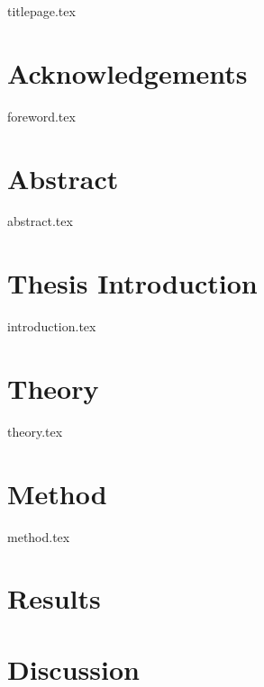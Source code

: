 \documentclass[12pt, a4paper]{report}
\begin{document}
{titlepage.tex}

\chapter*{Acknowledgements}
{foreword.tex}
\afterpage{\blankpage}

\chapter*{Abstract}
{abstract.tex}
\afterpage{\blankpage}

\tableofcontents
\newpage
\afterpage{\blankpage}

\chapter{Thesis Introduction}
{introduction.tex}

\chapter{Theory}
{theory.tex}

\chapter{Method}
{method.tex}

\chapter{Results}

\chapter{Discussion}

\onecolumn
{}
\printbibliography[title = {References}]
\end{document}
